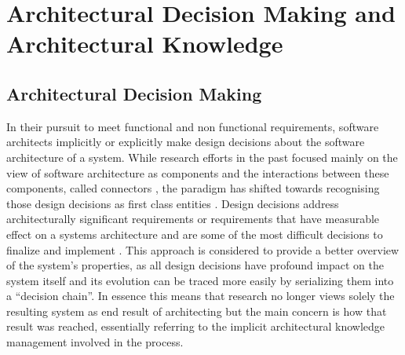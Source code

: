\chapter{Architectural Decision Making and Architectural Knowledge}
    \section{Architectural Decision Making}
        In their pursuit to meet functional and non functional requirements, software architects implicitly or explicitly make design decisions about the software architecture of a system. While research efforts in the past focused mainly on the view of software architecture as components and the interactions between these components, called connectors \cite{software_arch_in_practice_book, intro_to_software_arch_TOPICS}, the paradigm has shifted towards recognising those design decisions as first class entities \cite{first-class-Arch-decisions}. Design decisions address architecturally significant requirements or requirements that have measurable effect on a systems architecture and are some of the most difficult decisions to finalize and implement \cite{software_arch_in_practice_book}. This approach is considered to provide a better overview of the system's properties, as all design decisions have profound impact on the system itself and its evolution can be traced more easily by serializing them into a ``decision chain''. In essence this means that research no longer views solely the resulting system as end result of architecting but the main concern is how that result was reached, essentially referring to the implicit architectural knowledge management involved in the process.

